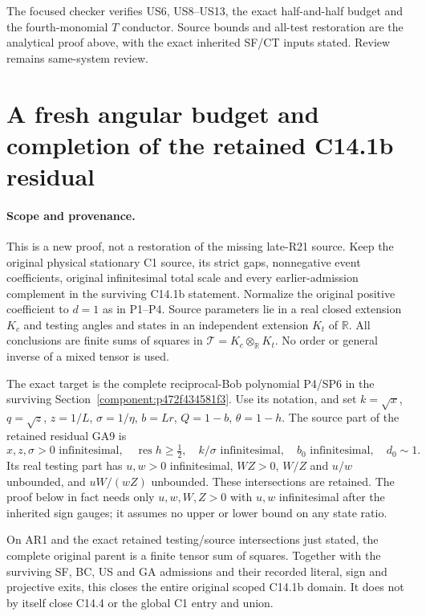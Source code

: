 The focused checker verifies US6, US8--US13, the exact half-and-half
budget and the fourth-monomial $T$ conductor. Source bounds and
all-test restoration are the analytical proof above, with the exact
inherited SF/CT inputs stated. Review remains same-system review.


\section{\texorpdfstring{A fresh angular budget and completion of the retained C14.1b residual}{A fresh angular budget and completion of the retained C14.1b residual}}
\label{component:p4e5ba027f187}

\label{p4e5ba027f187:sec:c141b-residual-rederived}

\paragraph{Scope and provenance.}
This is a new proof, not a restoration of the missing late-R21 source.
Keep the original physical stationary C1 source, its strict gaps,
nonnegative event coefficients, original infinitesimal total scale and
every earlier-admission complement in the surviving C14.1b statement.
Normalize the original positive coefficient to $d=1$ as in P1--P4.
Source parameters lie in a real closed extension $K_c$ and testing
angles and states in an independent extension $K_t$ of $\mathbb R$.
All conclusions are finite sums of squares in
$\mathcal T=K_c\otimes_{\mathbb R}K_t$. No order or general inverse
of a mixed tensor is used.

The exact target is the complete reciprocal-Bob polynomial P4/SP6
in the surviving Section~\ref{component:p472f434581f3}.
Use its notation, and set $k=\sqrt x$, $q=\sqrt z$, $z=1/L$,
$\sigma=1/\eta$, $b=Lr$, $Q=1-b$, $\theta=1-h$.
The source part of the retained residual GA9 is
\[
 x,z,\sigma>0\text{ infinitesimal},\quad
 \operatorname{res}h\ge\tfrac12,\quad k/\sigma\text{ infinitesimal},
 \quad b_0\text{ infinitesimal},\quad d_0\sim1.
 \tag{AR1}
\]
Its real testing part has $u,w>0$ infinitesimal, $WZ>0$,
$W/Z$ and $u/w$ unbounded, and $uW/(wZ)$ unbounded. These
intersections are retained. The proof below in fact needs only
$u,w,W,Z>0$ with $u,w$ infinitesimal after the inherited sign
gauges; it assumes no upper or lower bound on any state ratio.

\begin{theorem}
On AR1 and the exact retained testing/source intersections just
stated, the complete original parent is a finite tensor sum of
squares. Together with the surviving SF, BC, US and GA admissions
and their recorded literal, sign and projective exits, this closes
the entire original scoped C14.1b domain. It does not by itself
close C14.4 or the global C1 entry and union.
\end{theorem}


